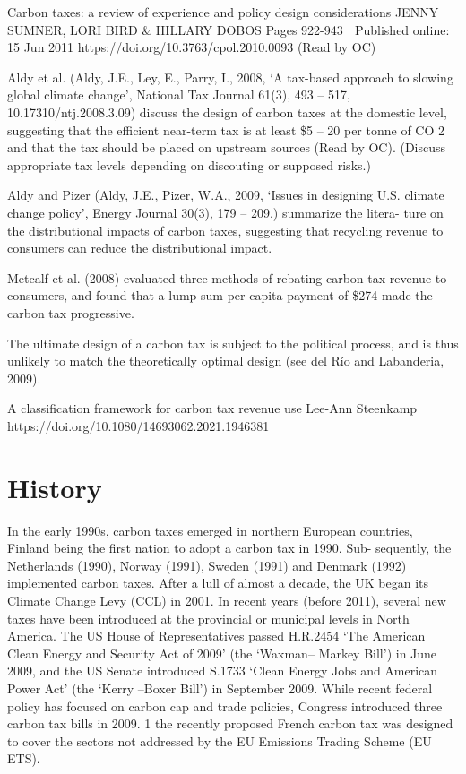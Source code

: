\documentclass[version=3.21, pagesize, twoside=off, bibliography=totoc, DIV=calc, fontsize=12pt, a4paper, french, english]{scrartcl}
\begin{document}
Carbon taxes: a review of experience and policy design considerations JENNY SUMNER, LORI BIRD \& HILLARY DOBOS Pages 922-943 | Published online: 15 Jun 2011 https://doi.org/10.3763/cpol.2010.0093 (Read by OC)

Aldy et al. (Aldy, J.E., Ley, E., Parry, I., 2008, ‘A tax-based approach to slowing global climate change’, National Tax Journal 61(3),
493 – 517, 10.17310/ntj.2008.3.09) discuss the design of carbon taxes
at the domestic level, suggesting that the efficient near-term tax is at least \$5 – 20 per tonne of CO 2 and
that the tax should be placed on upstream sources (Read by OC). (Discuss appropriate tax levels depending on discouting or supposed risks.)
 
Aldy and Pizer (Aldy, J.E., Pizer, W.A., 2009, ‘Issues in designing U.S. climate change policy’, Energy Journal 30(3), 179 – 209.) summarize the litera-
ture on the distributional impacts of carbon taxes, suggesting that recycling revenue to consumers can
reduce the distributional impact.

Metcalf et al. (2008) evaluated three methods of rebating
carbon tax revenue to consumers, and found that a lump sum per capita payment of \$274 made the
carbon tax progressive.

The ultimate design of a carbon tax is subject to the political process, and is thus unlikely to match the theoretically optimal design (see del Río and Labanderia, 2009).

A classification framework for carbon tax revenue use
Lee-Ann Steenkamp
https://doi.org/10.1080/14693062.2021.1946381 

\section{History}
In the early 1990s, carbon taxes emerged
in northern European countries, Finland being the first nation to adopt a carbon tax in 1990. Sub-
sequently, the Netherlands (1990), Norway (1991), Sweden (1991) and Denmark (1992) implemented
carbon taxes. After a lull of almost a decade, the UK began its Climate Change Levy (CCL) in 2001. In
recent years (before 2011), several new taxes have been introduced at the provincial or municipal levels in North
America.
The US House of Representatives
passed H.R.2454 ‘The American Clean Energy and Security Act of 2009’ (the ‘Waxman– Markey Bill’) in
June 2009, and the US Senate introduced S.1733 ‘Clean Energy Jobs and American Power Act’ (the
‘Kerry –Boxer Bill’) in September 2009. While recent federal policy has focused on carbon cap and
trade policies, Congress introduced three carbon tax bills in 2009. 1
the recently proposed French carbon tax was
designed to cover the sectors not addressed by the EU Emissions Trading Scheme (EU ETS).
\end{document}
